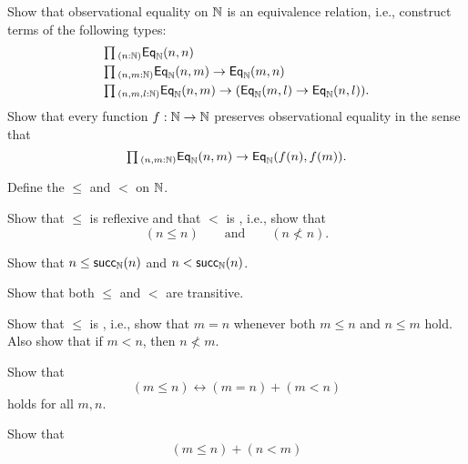 \begin{exercises}
\exercise \label{ex:obs_nat_eqrel}Show that observational equality on ${\mathbb{N}}$ is an equivalence relation, i.e., construct terms of the following types:
  \begin{align*}
    & \prd{n:\N} \EqN(n,n) \\
    & \prd{n,m:\N} \EqN(n,m)\to \EqN(m,n) \\
    & \prd{n,m,l:\N} \EqN(n,m)\to (\EqN(m,l)\to \EqN(n,l)).
  \end{align*}
\exercise {}Show that every function $f:{\mathbb{N}}\to {\mathbb{N}}$ preserves observational equality in the sense that
  \begin{equation*}
    \prd{n,m:\N} \EqN(n,m)\to \EqN(f(n),f(m)).
  \end{equation*}
\exercise \label{ex:order_N}
  \begin{subexenum}
  \item Define the  $\leq$ and $<$ on ${\mathbb{N}}$.
  \item Show that $\leq$ is reflexive and that $<$ is , i.e., show that
    \begin{equation*}
      (n\leq n)\qquad\text{and}\qquad (n\nless n).
    \end{equation*}
  \item Show that $n\leq\mathsf{succ}_{{\mathbb{N}}}(n)$ and $n<\mathsf{succ}_{{\mathbb{N}}}(n)$.
  \item Show that both $\leq$ and $<$ are transitive.
  \item Show that $\leq$ is , i.e., show that $m=n$ whenever both $m\leq n$ and $n\leq m$ hold. Also show that if $m<n$, then $n\nless m$.
  \item Show that
    \begin{equation*}
      (m\leq n)\leftrightarrow (m=n)+(m<n)
    \end{equation*}
    holds for all $m,n$.
  \item Show that
    \begin{equation*}
      (m\leq n)+(n<m)
    \end{equation*}

\end{subexenum}
\end{exercises}

